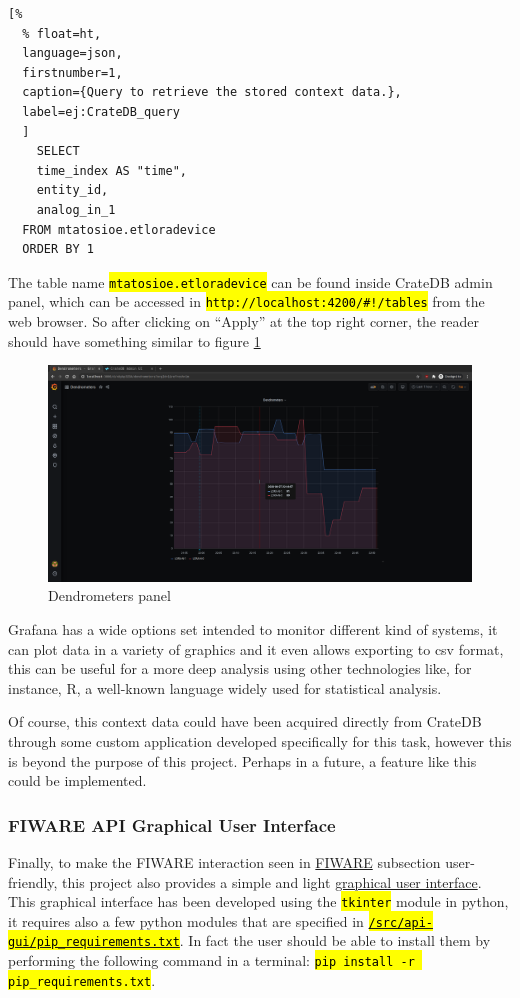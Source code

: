 \documentclass[11pt,a4paper,dvipsnames,twoside]{article}
\newcommand{\cmd}[1] {\hl{\texttt{#1}}}
\begin{document}
\begin{lstlisting}[%
  % float=ht,
  language=json,
  firstnumber=1,
  caption={Query to retrieve the stored context data.},
  label=ej:CrateDB_query
  ]
    SELECT
    time_index AS "time",
    entity_id,
    analog_in_1
  FROM mtatosioe.etloradevice
  ORDER BY 1
\end{lstlisting}

The table name \cmd{mtatosioe.etloradevice} can be found inside CrateDB admin panel, which can be accessed in \cmd{http://localhost:4200/\#!/tables} from the web browser. So after clicking on \enquote{Apply} at the top right corner, the reader should have something similar to figure \ref{fig:final_panel}

\begin{figure}[ht]
  \centering
  \includegraphics[width=.9\textwidth]{../pictures/Grafana_final_panel.png}
  \caption{Dendrometers panel}
  \label{fig:final_panel}
\end{figure}

Grafana has a wide options set intended to monitor different kind of systems, it can plot data in a variety of graphics and it even allows exporting to csv format, this can be useful for a more deep analysis using other technologies like, for instance, R, a well-known language widely used for statistical analysis.

Of course, this context data could have been acquired directly from CrateDB through some custom application developed specifically for this task, however this is beyond the purpose of this project. Perhaps in a future, a feature like this could be implemented.

\subsubsection{FIWARE API Graphical User Interface}\label{sssec:API_GUI}
Finally, to make the FIWARE interaction seen in \hyperref[sssec:FIWARE]{FIWARE} subsection user-friendly, this project also provides a simple and light \href{https://github.com/WyRe/lora-arduino-dendrometer/blob/master/src/api-gui/api-gui.py}{graphical user interface}. This graphical interface has been developed using the \cmd{tkinter} module in python, it requires also a few python modules that are specified in \href{https://github.com/WyRe/lora-arduino-dendrometer/blob/master/src/api-gui/pip_requirements.txt}{\cmd{/src/api-gui/pip\_requirements.txt}}. In fact the user should be able to install them by performing the following command in a terminal: \cmd{pip install -r pip\_requirements.txt}.
\end{document}
